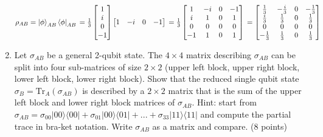 \documentclass{article}
\begin{document}
\begin{enumerate}
          $\rho_{AB}
              \\= \ket{\phi}_{AB}\bra{\phi}_{AB}
              \\=\frac{1}{3}\begin{bmatrix}
                  1 \\ i \\ 0 \\ -1 \\
              \end{bmatrix}\begin{bmatrix}
                  1 & -i & 0 & -1 \\
              \end{bmatrix}
              \\=\frac{1}{3}\begin{bmatrix}
                  1  & -i & 0 & -1 \\
                  i  & 1  & 0 & 1  \\
                  0  & 0  & 0 & 0  \\
                  -1 & 1  & 0 & 1  \\
              \end{bmatrix}
              \\=\begin{bmatrix}
                  \frac{1}{3}  & -\frac{i}{3} & 0 & -\frac{1}{3} \\
                  \frac{i}{3}  & \frac{1}{3}  & 0 & \frac{1}{3}  \\
                  0            & 0            & 0 & 0            \\
                  -\frac{1}{3} & \frac{1}{3}  & 0 & \frac{1}{3}  \\
              \end{bmatrix}
          $

    \item Let $\sigma_{AB}$ be a general 2-qubit state. The $4\times4$ matrix describing $\sigma_{AB}$ can be split into four sub-matrices of size $2\times2$ (upper left block, upper right block, lower left block, lower right block). Show that the reduced single qubit state $\sigma_B = \mathrm{Tr}_A(\sigma_{AB})$ is described by a $2\times2$ matrix that is the sum of the upper left block and lower right block matrices of $\sigma_{AB}$. Hint: start from $\sigma_{AB} = \sigma_{00}|00\rangle\langle00| + \sigma_{01}|00\rangle\langle01| + ... + \sigma_{33}|11\rangle\langle11|$ and compute the partial trace in bra-ket notation. Write $\sigma_{AB}$ as a matrix and compare. (8 points)


\end{enumerate}
\end{document}
